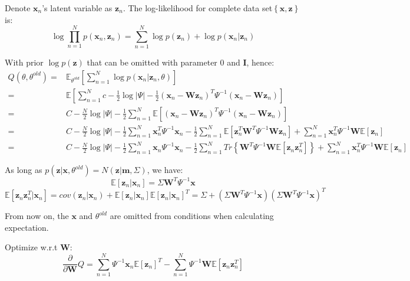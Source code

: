 \documentclass[UTF8]{ctexart}
\begin{document}
Denote $\textbf{x}_{n}$'s latent variable as $\textbf{z}_{n}$. The log-likelihood for complete data set$\left\{ \textbf{x},\textbf{z} \right\}$ is:
$$\log \prod_{n=1}^{N}p(\textbf{x}_{n},\textbf{z}_{n})=\sum_{n=1}^{N}\log p(\textbf{z}_{n})+\log p(\textbf{x}_{n}|\textbf{z}_{n})$$

With prior $\log p(\textbf{z})$ that can be omitted with parameter $0$ and $\textbf{I}$, hence:
\begin{align}
Q(\theta,\theta^{old})=&\mathbb{E}_{\theta^{old}}[\sum_{n=1}^{N}\log p(\textbf{x}_{n}|\textbf{z}_{n},\theta)]\nonumber \\
=&\mathbb{E}[\sum_{n=1}^{N} c-\frac{1}{2}\log |\Psi|-\frac{1}{2}(\textbf{x}_{n}-\textbf{W}\textbf{z}_{n})^{T}\Psi^{-1}(\textbf{x}_{n}-\textbf{W}\textbf{z}_{n})]\nonumber \\
=&C -\frac{N}{2}\log |\Psi|-\frac{1}{2}\sum_{n=1}^{N}\mathbb{E}[(\textbf{x}_{n}-\textbf{W}\textbf{z}_{n})^{T}\Psi^{-1}(\textbf{x}_{n}-\textbf{W}\textbf{z}_{n})]\nonumber \\
=&C-\frac{N}{2}\log |\Psi|-\frac{1}{2}\sum_{n=1}^{N}\textbf{x}_{n}^{T}\Psi^{-1}\textbf{x}_{n}-\frac{1}{2}\sum_{n=1}^{N}\mathbb{E}[\textbf{z}_{n}^{T}\textbf{W}^{T}\Psi^{-1}\textbf{W}\textbf{z}_{n}]+\sum_{n=1}^{N}\textbf{x}_{n}^{T}\Psi^{-1}\textbf{W}\mathbb{E}[\textbf{z}_{n}]\nonumber \\
=&C-\frac{N}{2}\log |\Psi|-\frac{1}{2}\sum_{n=1}^{N}\textbf{x}_{n}\Psi^{-1}\textbf{x}_{n}-\frac{1}{2}\sum_{n=1}^{N}Tr\left\{ \textbf{W}^{T}\Psi^{-1}\textbf{W}\mathbb{E}[\textbf{z}_{n}\textbf{z}_{n}^{T}]\right\} +\sum_{n=1}^{N}\textbf{x}_{n}^{T}\Psi^{-1}\textbf{W}\mathbb{E}[\textbf{z}_{n}]\nonumber
\end{align}


As long as $p(\textbf{z}|\textbf{x},\theta^{old})=N(\textbf{z}|\textbf{m},\Sigma)$, we have:
$$\mathbb{E}[\textbf{z}_{n}|\textbf{x}_{n}]=\Sigma\textbf{W}^{T}\Psi^{-1}\textbf{x}$$
$$\mathbb{E}[\textbf{z}_{n}\textbf{z}_{n}^{T}|\textbf{x}_{n}]=cov(\textbf{z}_{n}|\textbf{x}_{n})+\mathbb{E}[\textbf{z}_{n}|\textbf{x}_{n}]\mathbb{E}[\textbf{z}_{n}|\textbf{x}_{n}]^{T}=\Sigma + (\Sigma\textbf{W}^{T}\Psi^{-1}\textbf{x})(\Sigma\textbf{W}^{T}\Psi^{-1}\textbf{x})^{T}$$

From now on, the $\textbf{x}$ and $\theta^{old}$ are omitted from conditions when calculating expectation.

Optimize w.r.t $\textbf{W}$:
$$\frac{\partial}{\partial \textbf{W}}Q=\sum_{n=1}^{N}\Psi^{-1}\textbf{x}_{n}\mathbb{E}[\textbf{z}_{n}]^{T}-\sum_{n=1}^{N}\Psi^{-1}\textbf{W}\mathbb{E}[\textbf{z}_{n}\textbf{z}_{n}^{T}]$$
\end{document}

